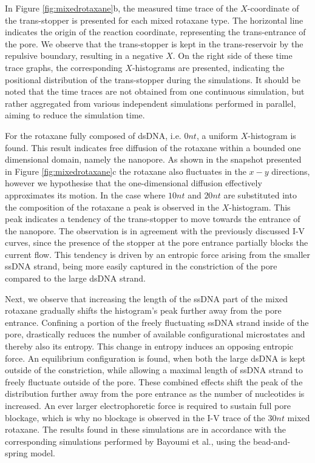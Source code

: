 In Figure \ref{fig:mixedrotaxane}b, the measured time trace of the $X$-coordinate of the
trans-stopper is presented for each mixed rotaxane type.  The horizontal line indicates
the origin of the reaction coordinate, representing the trans-entrance of the pore.
We observe that the trans-stopper is kept in the trans-reservoir by the repulsive
boundary,
resulting in a negative $X$. On the right side of these time trace graphs, the
corresponding $X$-histograms are presented, indicating the positional distribution of
the trans-stopper during the simulations. It should be noted that the time traces are not
obtained from one continuous simulation, but rather aggregated from various independent
simulations performed in parallel, aiming to reduce the simulation time.

For the rotaxane fully composed of dsDNA, i.e. $0nt$, a uniform  $X$-histogram is found.
This result indicates free diffusion of the rotaxane within a bounded one dimensional
domain, namely the nanopore. As shown in the snapshot presented in Figure
\ref{fig:mixedrotaxane}c the rotaxane also fluctuates in the $x-y$ directions, however we
hypothesise that the one-dimensional diffusion effectively approximates its motion.
In the case where $10nt$ and $20nt$ are substituted into the composition of the rotaxane
a peak is observed in the $X$-histogram. This peak indicates a tendency of the
trans-stopper to move towards the entrance of the nanopore. The observation is in
agreement with the previously discussed I-V curves, since the presence of the stopper at
the pore entrance partially blocks the current flow. This tendency is driven by an
entropic force arising from the smaller ssDNA strand, being more easily captured in the
constriction of the pore compared to the large dsDNA strand.

Next, we observe that increasing the length of the ssDNA part of the mixed rotaxane
gradually shifts the histogram's peak further away from the pore entrance. Confining a
portion of the freely fluctuating ssDNA strand inside of the pore,
drastically reduces the number of available configurational microstates and thereby also
its entropy. This change in entropy induces an opposing entropic force.
An equilibrium configuration is found, when both the large dsDNA is kept outside of the
constriction, while allowing a maximal length of ssDNA strand to freely fluctuate outside
of the pore. These combined effects shift the peak of the distribution further away from
the pore entrance as the number of nucleotides is increased. An ever larger
electrophoretic force is required to sustain full pore blockage, which is why no blockage
is observed in the I-V trace of the $30nt$ mixed rotaxane. The results found in these
simulations are in accordance with the corresponding simulations performed by Bayoumi et
al., using the bead-and-spring model.

